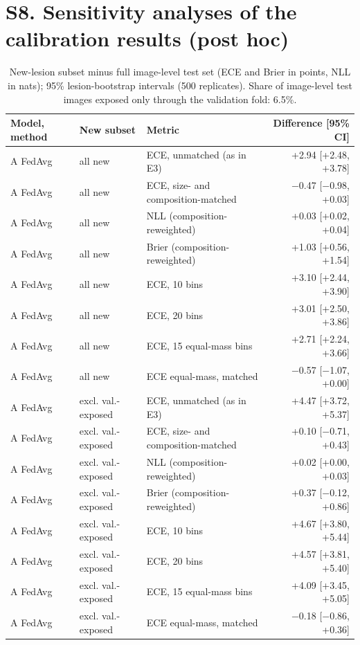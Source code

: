 \documentclass[10pt]{article}
\begin{document}
\section*{S8. Sensitivity analyses of the calibration results (post hoc)}
\begin{table}[!htbp]
\centering
\scriptsize
\caption{New-lesion subset minus full image-level test set (ECE and Brier in points, NLL in nats); 95\% lesion-bootstrap intervals (500 replicates). Share of image-level test images exposed only through the validation fold: 6.5\%.}
\label{tab:s8}
\begin{tabular}{@{}lllr@{}}
\toprule
Model, method & New subset & Metric & Difference [95\% CI] \\
\midrule
A FedAvg & all new & ECE, unmatched (as in E3) & +2.94 [+2.48, +3.78] \\
A FedAvg & all new & ECE, size- and composition-matched & $-$0.47 [$-$0.98, +0.03] \\
A FedAvg & all new & NLL (composition-reweighted) & +0.03 [+0.02, +0.04] \\
A FedAvg & all new & Brier (composition-reweighted) & +1.03 [+0.56, +1.54] \\
A FedAvg & all new & ECE, 10 bins & +3.10 [+2.44, +3.90] \\
A FedAvg & all new & ECE, 20 bins & +3.01 [+2.50, +3.86] \\
A FedAvg & all new & ECE, 15 equal-mass bins & +2.71 [+2.24, +3.66] \\
A FedAvg & all new & ECE equal-mass, matched & $-$0.57 [$-$1.07, +0.00] \\
A FedAvg & excl. val.-exposed & ECE, unmatched (as in E3) & +4.47 [+3.72, +5.37] \\
A FedAvg & excl. val.-exposed & ECE, size- and composition-matched & +0.10 [$-$0.71, +0.43] \\
A FedAvg & excl. val.-exposed & NLL (composition-reweighted) & +0.02 [+0.00, +0.03] \\
A FedAvg & excl. val.-exposed & Brier (composition-reweighted) & +0.37 [$-$0.12, +0.86] \\
A FedAvg & excl. val.-exposed & ECE, 10 bins & +4.67 [+3.80, +5.44] \\
A FedAvg & excl. val.-exposed & ECE, 20 bins & +4.57 [+3.81, +5.40] \\
A FedAvg & excl. val.-exposed & ECE, 15 equal-mass bins & +4.09 [+3.45, +5.05] \\
A FedAvg & excl. val.-exposed & ECE equal-mass, matched & $-$0.18 [$-$0.86, +0.36] \\

\end{tabular}
\end{table}
\end{document}
